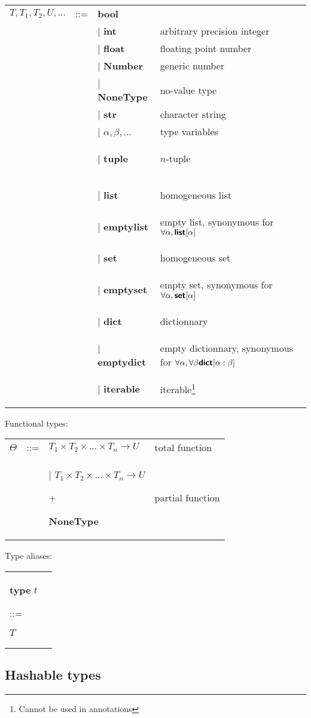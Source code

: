 \documentclass[a4paper]{article}
\newcommand{\kw}[1]{\textsf{\textbf{#1}}}
\newcommand{\code}[1]{\begin{sffamily}#1\end{sffamily}}
\begin{document}
\begin{tabular}{llll}
$T, T_1, T_2,U,\ldots$ & ::= & \kw{bool} \\
& &  | \kw{int} & arbitrary precision integer\\
& &  | \kw{float} & floating point number\\
& &  | \kw{Number} & generic number \\
& &  | \kw{NoneType} & no-value type \\
& &  | \kw{str} & character string \\
& &  | $\alpha,\beta,\ldots$ & type variables \\
& &  | \kw{tuple}\code{[}$T_1,T_2,\ldots,T_n$\code{]} & $n$-tuple \\
& &  | \kw{list}\code{[}$T$\code{]} & homogeneous list\\
& &  | \kw{emptylist} & empty list, synonymous for $\forall \alpha, \kw{list}[\alpha]$ \\
& &  | \kw{set}\code{[}$T$\code{]} & homogeneous set\\
& &  | \kw{emptyset} & empty set, synonymous for $\forall \alpha, \kw{set}[\alpha]$ \\
& &  | \kw{dict}\code{[}$T$\code{:}$U$\code{]} & dictionnary \\
& &  | \kw{emptydict} & empty dictionnary, synonymous for $\forall \alpha, \forall \beta \kw{dict}[\alpha:\beta]$ \\
& &  | \kw{iterable}\code{[}$T$\code{]} & iterable\footnote{Cannot be used in annotations} \\
\end{tabular}

Functional types:

\begin{tabular}{llll}
$\Theta$ & ::= & $T_1 \times T_2 \times \ldots \times T_n \rightarrow U$ & total function \\
  & & | $T_1 \times T_2 \times \ldots \times T_n \rightarrow U$ \code{+} \kw{NoneType} & partial function \\
\end{tabular}

Type aliases:

\begin{tabular}{ll}
\kw{type} $t$ \code{::=} $T$
\end{tabular}

\subsection{Hashable types}
\end{document}
